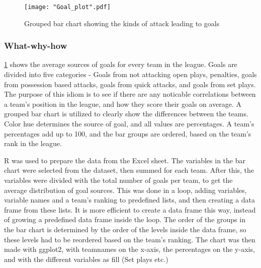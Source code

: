 \documentclass[Report.tex]{subfiles}
\begin{document}
\begin{figure}
\center
\texttt{[image: "Goal\_plot".pdf]}
\caption{Grouped bar chart showing the kinds of attack leading to goals}
\label{Fig:Goal_plot}
\end{figure}

\subsubsection{What-why-how}
\ref{Fig:Goal_plot} shows the average sources of goals for every team in the
league. Goals are divided into five categories - Goals from not attacking open
plays, penalties, goals from possession based attacks, goals from quick attacks,
and goals from set plays. 
The purpose of this idiom is to see if there are any noticable correlations
between a team's position in the league, and how they score their goals on
average. 
A grouped bar chart is utilized to clearly show the differences between the
teams. Color hue determines the source of goal, and all values are
percentages. A team's percentages add up to 100, and the bar groups are ordered,
based on the team's rank in the league. 

R was used to prepare the data from the Excel sheet. The variables in the bar
chart were selected from the dataset, then summed for each team. After this, the
variables were divided with the total number of goals per team, to get the
average distribution of goal sources. 
This was done in a loop, adding variables, variable names and a team's ranking
to predefined lists, and then creating a data frame from these lists. It is more
efficient to create a data frame this way, instead of growing a predefined data
frame inside the loop. 
The order of the groups in the bar chart is determined by the order of the
levels inside the data frame, so these levels had to be reordered based on the
team's ranking.
The chart was then made with ggplot2, with teamnames on the x-axis, the
percentages on the y-axis, and with the different variables as fill (Set plays
etc.)
\end{document}
